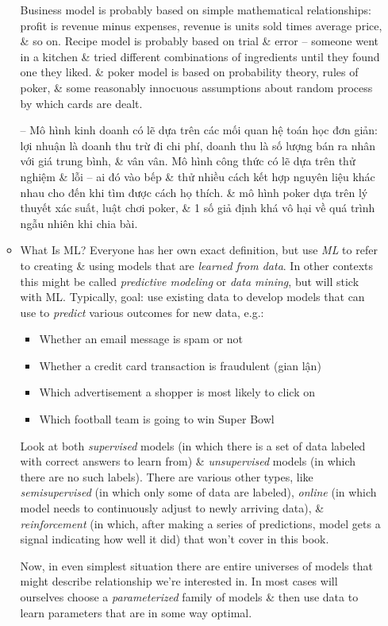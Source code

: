 \documentclass{article}
\begin{document}
\begin{itemize}
\begin{itemize}
		Business model is probably based on simple mathematical relationships: profit is revenue minus expenses, revenue is units sold times average price, \& so on. Recipe model is probably based on trial \& error -- someone went in a kitchen \& tried different combinations of ingredients until they found one they liked. \& poker model is based on probability theory, rules of poker, \& some reasonably innocuous assumptions about random process by which cards are dealt.
		
		-- Mô hình kinh doanh có lẽ dựa trên các mối quan hệ toán học đơn giản: lợi nhuận là doanh thu trừ đi chi phí, doanh thu là số lượng bán ra nhân với giá trung bình, \& vân vân. Mô hình công thức có lẽ dựa trên thử nghiệm \& lỗi -- ai đó vào bếp \& thử nhiều cách kết hợp nguyên liệu khác nhau cho đến khi tìm được cách họ thích. \& mô hình poker dựa trên lý thuyết xác suất, luật chơi poker, \& 1 số giả định khá vô hại về quá trình ngẫu nhiên khi chia bài.
		\item {\sf What Is ML?} Everyone has her own exact definition, but use {\it ML} to refer to creating \& using models that are {\it learned from data}. In other contexts this might be called {\it predictive modeling} or {\it data mining}, but will stick with ML. Typically, goal: use existing data to develop models that can use to {\it predict} various outcomes for new data, e.g.:
		\begin{itemize}
			\item Whether an email message is spam or not
			\item Whether a credit card transaction is fraudulent (gian lận)
			\item Which advertisement a shopper is most likely to click on
			\item Which football team is going to win Super Bowl
		\end{itemize}
		Look at both {\it supervised} models (in which there is a set of data labeled with correct answers to learn from) \& {\it unsupervised} models (in which there are no such labels). There are various other types, like {\it semisupervised} (in which only some of data are labeled), {\it online} (in which model needs to continuously adjust to newly arriving data), \& {\it reinforcement} (in which, after making a series of predictions, model gets a signal indicating how well it did) that won't cover in this book.
		
		Now, in even simplest situation there are entire universes of models that might describe relationship we're interested in. In most cases will ourselves choose a {\it parameterized} family of models \& then use data to learn parameters that are in some way optimal.
		

\end{itemize}
\end{itemize}
\end{document}
